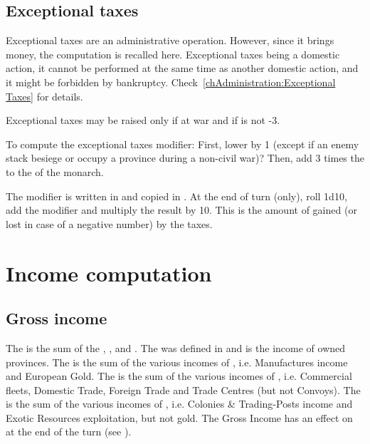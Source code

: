 \subsection{Exceptional taxes}\label{chIncomes:Exceptional Taxes}
\aparag Exceptional taxes are an administrative operation. However,
since it brings money, the computation is recalled here.
\bparag Exceptional taxes being a domestic action, it cannot be
performed at the same time as another domestic action, and it might be
forbidden by bankruptcy.
\bparag Check~\ref{chAdministration:Exceptional Taxes} for details.

\aparag Exceptional taxes may be raised only if at war and if \STAB is
not -3.

\aparag[Summary.] To compute the exceptional taxes modifier:
\bparag First, lower \STAB by 1 (except if an enemy stack besiege or
occupy a province during a non-civil war)?
\bparag Then, add 3 times the \STAB to the \ADM of the monarch.

\aparag The modifier is written in  and copied in .
\bparag At the end of turn (only), roll 1d10, add the modifier and
multiply the result by 10.
\bparag This is the amount of \ducats gained (or lost in case of a
negative number) by the taxes.

\section{Income computation}\label{chIncomes:Summary}
\subsection{Gross income}
\aparag The  is the sum of the ,
,  and .
\bparag The  was defined in
 and is the income of owned provinces.
\bparag The  is the sum of the various incomes
of , i.e. Manufactures income and European
Gold.
\bparag The  is the sum of the various incomes of
, i.e. Commercial fleets, Domestic Trade,
Foreign Trade and Trade Centres (but not Convoys).
\bparag The  is the sum of the various incomes of
, i.e. Colonies \& Trading-Posts income and
Exotic Resources exploitation, but not \ROTW gold.
\bparag[Stability] The Gross Income has an effect on \STAB at the end of
the turn (see ).


